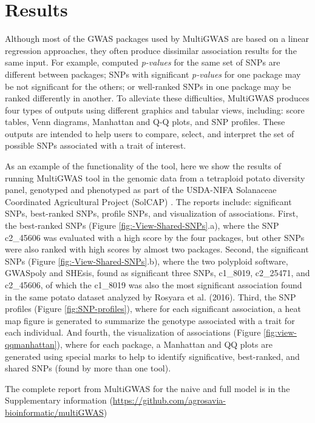 \documentclass{article}
\begin{document}
\section{Results}

Although most of the GWAS packages used by MultiGWAS are based on a linear regression approaches, they often produce dissimilar association results for the same input. For example, computed \emph{p-values }for the same set of SNPs are different between packages; SNPs with significant \emph{p-values} for one package may be not significant for the others; or well-ranked SNPs in one package may be ranked differently in another. To alleviate these difficulties, MultiGWAS produces four types of outputs using different graphics and tabular views, including: score tables, Venn diagrams, Manhattan and Q-Q plots, and SNP profiles. These outputs are intended to help users to compare, select, and interpret the set of possible SNPs associated with a trait of interest. 

As an example of the functionality of the tool, here we show the results of running MultiGWAS tool in the genomic data from a tetraploid potato diversity panel, genotyped and phenotyped as part of the USDA-NIFA Solanaceae Coordinated Agricultural Project (SolCAP) \cite{Hirsch2013}. The reports include: significant SNPs, best-ranked SNPs, profile SNPs, and visualization of associations. First, the best-ranked SNPs (Figure \ref{fig:-View-Shared-SNPs}.a), where the SNP c2\_45606 was evaluated with a high score by the four packages, but other SNPs were also ranked with high scores by almost two packages. Second, the significant SNPs (Figure \ref{fig:-View-Shared-SNPs}.b), where the two polyploid software, GWASpoly and SHEsis, found as significant three SNPs, c1\_8019, c2\_25471, and c2\_45606, of which the c1\_8019 was also the most significant association found in the same potato dataset analyzed by Rosyara et al. (2016). Third, the SNP profiles (Figure \ref{fig:SNP-profiles}), where for each significant association, a heat map figure is generated to summarize the genotype associated with a trait for each individual. And fourth, the visualization of associations (Figure \ref{fig:view-qqmanhattan}), where for each package, a Manhattan and QQ plots are generated using special marks to help to identify significative, best-ranked, and shared SNPs (found by more than one tool). 

The complete report from MultiGWAS for the naive and full model is in the Supplementary information (\url{https://github.com/agrosavia-bioinformatic/multiGWAS}) 
\end{document}
